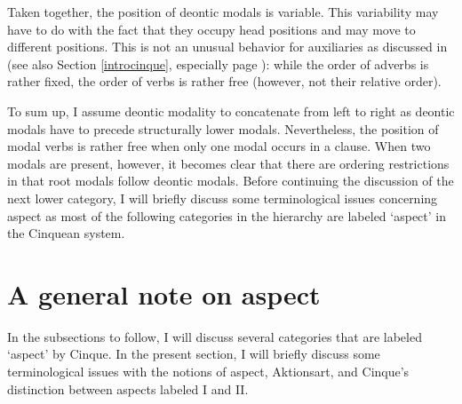 \begin{exe}
\ex\label{deonticexamplesdgscombiningbla}\begin{xlist}
\end{xlist}
\end{exe}

\noindent Taken together, the position of deontic modals is variable. This variability may have to do with the fact that they occupy head positions and may move to different positions. This is not an unusual behavior for auxiliaries as discussed in \citet[49]{cinque1999adverbs}  (see also Section \ref{introcinque}, especially page \pageref{finiteauxcinque}): while the order of adverbs is rather fixed, the order of verbs is rather free (however, not their relative order).

To sum up, I assume deontic modality to concatenate from left to right as deontic modals have to precede structurally lower modals. Nevertheless, the position of modal verbs is rather free when only one modal occurs in a clause. When two modals are present, however, it becomes clear that there are ordering restrictions in that root modals follow deontic modals. Before continuing the discussion of the next lower category, I will briefly discuss some terminological issues concerning aspect as most of the following categories in the hierarchy are labeled `aspect' in the Cinquean system.

\section{A general note on aspect}\label{generalaspect}
In the subsections to follow, I will discuss several categories that are labeled `aspect' by Cinque. In the present section, I will briefly discuss some terminological issues with the notions of aspect, Aktionsart, and Cinque's distinction between aspects labeled I and II. 


